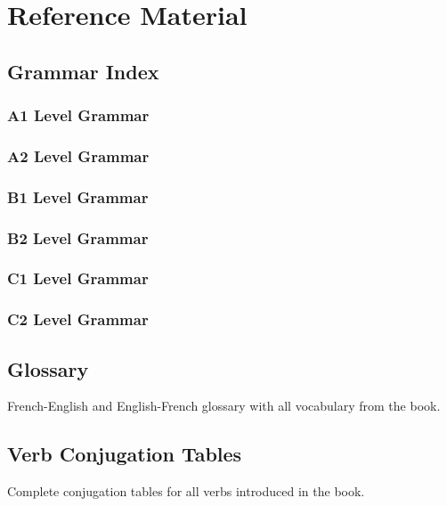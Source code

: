 
\part{Reference Material}
\label{part:reference}

\chapter{Grammar Index}
\label{chap:grammar}

\section*{A1 Level Grammar}
\section*{A2 Level Grammar}
\section*{B1 Level Grammar}
\section*{B2 Level Grammar}
\section*{C1 Level Grammar}
\section*{C2 Level Grammar}

\chapter{Glossary}
\label{chap:glossary}

French-English and English-French glossary with all vocabulary from the book.

\chapter{Verb Conjugation Tables}
\label{chap:verbs}

Complete conjugation tables for all verbs introduced in the book.

